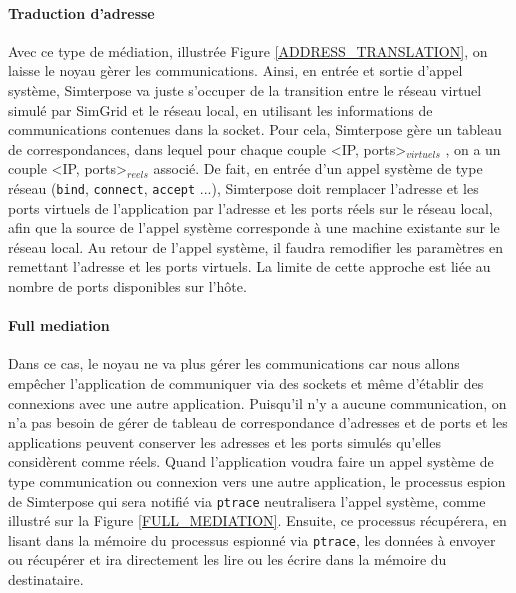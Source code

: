 \paragraph{Traduction d'adresse}
 Avec ce type de médiation, illustrée Figure \ref{ADDRESS_TRANSLATION}, on laisse le noyau gèrer les communications. Ainsi, en entrée et sortie d'appel système, Simterpose va juste s'occuper de la transition entre le réseau virtuel simulé
 par SimGrid et le réseau local, en utilisant les informations de communications
 contenues dans la socket. Pour cela, Simterpose gère un tableau de
 correspondances, dans lequel pour chaque couple <IP, ports>$_{virtuels}$ , on a un
 couple <IP, ports>$_{reels}$ associé.  De fait, en entrée d'un appel système de
 type réseau (\texttt{bind}, \texttt{connect}, \texttt{accept} ...), Simterpose
 doit remplacer l'adresse et les ports virtuels de l'application par l'adresse
 et les ports réels sur le réseau local, afin que la source de l'appel système
 corresponde à une machine existante sur le réseau local. Au retour de l'appel
 système, il faudra remodifier les paramètres en remettant l'adresse et les
 ports virtuels. La limite de cette approche est liée au nombre de
 ports disponibles sur l'hôte.

\paragraph{Full mediation} \label{paragraph:FULL_MEDIATION}
Dans ce cas, le noyau ne va plus gérer les communications car nous allons
empêcher l'application de communiquer via des sockets et même d'établir des
connexions avec une autre application. Puisqu'il n'y a aucune communication, on
n'a pas besoin de gérer de tableau de correspondance d'adresses et de ports et
les applications peuvent conserver les adresses et les ports simulés qu'elles
considèrent comme réels. Quand l'application voudra faire un appel système de
type communication ou connexion vers une autre application, le processus espion
de Simterpose qui sera notifié via \texttt{ptrace} neutralisera l'appel système,
comme illustré sur la Figure \ref{FULL_MEDIATION}. Ensuite, ce processus
récupérera, en lisant dans la mémoire du processus espionné via \texttt{ptrace}, les données à
envoyer ou récupérer et ira directement les lire ou les écrire dans la mémoire
du destinataire.

